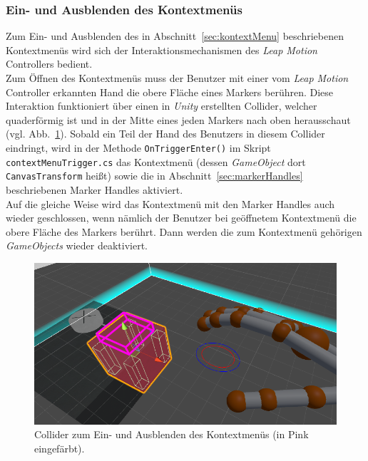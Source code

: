\subsubsection{Ein- und Ausblenden des Kontextmenüs}\label{sec:KontextMenuSwitch}%
Zum Ein- und Ausblenden des in Abschnitt~\ref{sec:kontextMenu} beschriebenen Kontextmenüs wird sich der Interaktionsmechanismen des \emph{Leap Motion} Controllers bedient.\\
Zum Öffnen des Kontextmenüs muss der Benutzer mit einer vom \emph{Leap Motion} Controller erkannten Hand die obere Fläche eines Markers berühren. Diese Interaktion funktioniert über einen in \emph{Unity} erstellten Collider, welcher quaderförmig ist und in der Mitte eines jeden Markers nach oben herausschaut (vgl. Abb.~\ref{fig:KontextmenuCollider}). Sobald ein Teil der Hand des Benutzers in diesem Collider eindringt, wird in der Methode \texttt{OnTriggerEnter()} im Skript \texttt{contextMenuTrigger.cs} das Kontextmenü (dessen \emph{GameObject} dort \texttt{CanvasTransform} heißt) sowie die in Abschnitt~\ref{sec:markerHandles} beschriebenen Marker Handles aktiviert.\\
Auf die gleiche Weise wird das Kontextmenü mit den Marker Handles auch wieder geschlossen, wenn nämlich der Benutzer bei geöffnetem Kontextmenü die obere Fläche des Markers berührt. Dann werden die zum Kontextmenü gehörigen \emph{GameObjects} wieder deaktiviert.

\begin{figure}
	\centering
	\includegraphics[width=\textwidth]{Bilder/Contextmenu_Collider}
	\caption[Collider zum Ein- und Ausblenden des Kontextmenüs]{Collider zum Ein- und Ausblenden des Kontextmenüs (in Pink eingefärbt).}
	\label{fig:KontextmenuCollider}
\end{figure}

